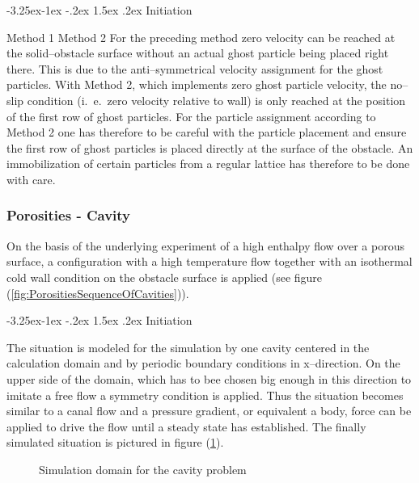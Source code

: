 \documentclass{report}
\makeatletter
\renewcommand\paragraph{\@startsection{paragraph}{4}{\z@}%
  {-3.25ex\@plus -1ex \@minus -.2ex}%
  {1.5ex \@plus .2ex}%
  {\normalfont\normalsize\bfseries}}
\makeatother
\begin{document}
\paragraph {Initiation}

Method 1
\linebreak
Method 2
For the preceding method zero velocity can be reached at the solid--obstacle surface without
an actual ghost particle being placed right there. This is due to the anti--symmetrical velocity assignment for the ghost particles. With Method 2, which implements zero ghost particle velocity, the no--slip condition (i.\ e.\ zero velocity relative to wall) is only reached at the position of the first row of ghost particles. For the particle assignment according to Method 2 one has therefore to be careful with the particle placement and ensure the first row of ghost particles is placed directly at the surface of the obstacle. An immobilization of certain particles from a regular lattice has therefore to be done with care.

\subsubsection{Porosities - Cavity}
On the basis of the underlying experiment of a high enthalpy flow over a porous surface, a configuration with a high temperature %
flow together with an isothermal cold wall condition on the obstacle surface is applied (see figure (\ref{fig:PorositiesSequenceOfCavities})).

\paragraph {Initiation}

The situation is modeled for the simulation by one cavity centered in the calculation domain and by periodic boundary conditions in x--direction. On the upper side of the domain, which has to bee chosen big enough in this direction to imitate a free flow a symmetry condition is applied. Thus the situation becomes similar to a canal flow and a pressure gradient, or equivalent a body, force can be applied to drive the flow until a steady state has established. The finally simulated situation is pictured in figure (\ref{fig:PorositiesCavitiesSimuDomain}).

\begin{figure}[!htbp]
  \centering
  \caption{Simulation domain for the cavity problem }
  \label{fig:PorositiesCavitiesSimuDomain}
\end{figure}
\end{document}
